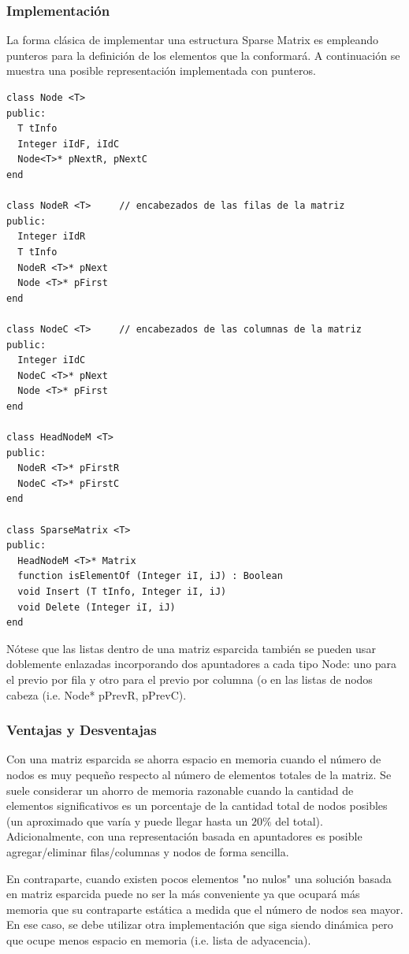 \subsubsection{Implementación}

La forma clásica de implementar una estructura Sparse Matrix es empleando punteros para la definición de los elementos que la conformará. A continuación se muestra una posible representación implementada con punteros.

\begin{lstlisting}[upquote=true, language=pseudo]
class Node <T>
public:
  T tInfo
  Integer iIdF, iIdC
  Node<T>* pNextR, pNextC
end

class NodeR <T>		// encabezados de las filas de la matriz
public:
  Integer iIdR
  T	tInfo
  NodeR <T>* pNext
  Node <T>* pFirst
end

class NodeC <T>		// encabezados de las columnas de la matriz
public:
  Integer iIdC
  NodeC <T>* pNext
  Node <T>* pFirst
end

class HeadNodeM <T>
public:
  NodeR <T>* pFirstR
  NodeC <T>* pFirstC
end

class SparseMatrix <T>
public:
  HeadNodeM <T>* Matrix
  function isElementOf (Integer iI, iJ) : Boolean
  void Insert (T tInfo, Integer iI, iJ)
  void Delete (Integer iI, iJ)
end
\end{lstlisting}

Nótese que las listas dentro de una matriz esparcida también se pueden usar doblemente enlazadas incorporando dos apuntadores a cada tipo Node: uno para el previo por fila y otro para el previo por columna (o en las listas de nodos cabeza (i.e. Node* pPrevR, pPrevC).


\subsubsection{Ventajas y Desventajas}

Con una matriz esparcida se ahorra espacio en memoria cuando el número de nodos es muy pequeño respecto al número de elementos totales de la matriz. Se suele considerar un ahorro de memoria razonable cuando la cantidad de elementos significativos es un porcentaje de la cantidad total de nodos posibles (un aproximado que varía y puede llegar hasta un $20\%$ del total). Adicionalmente, con una representación basada en apuntadores es posible agregar/eliminar filas/columnas y nodos de forma sencilla.

En contraparte, cuando existen pocos elementos "no nulos" una solución basada en matriz esparcida puede no ser la más conveniente ya que ocupará más memoria que su contraparte estática a medida que el número de nodos sea mayor. En ese caso, se debe utilizar otra implementación que siga siendo dinámica pero que ocupe menos espacio en memoria (i.e. lista de adyacencia).

